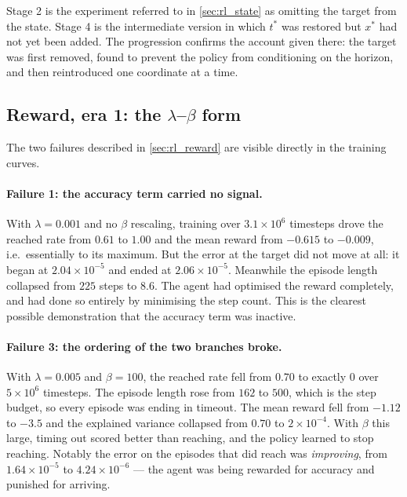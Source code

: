 Stage 2 is the experiment referred to in \cref{sec:rl_state} as omitting the
target from the state. Stage 4 is the intermediate version in which $t^*$ was
restored but $x^*$ had not yet been added. The progression confirms the
account given there: the target was first removed, found to prevent the policy
from conditioning on the horizon, and then reintroduced one coordinate at a
time.

\subsection{Reward, era 1: the \texorpdfstring{$\lambda$--$\beta$}{lambda-beta} form}
\label{sec:rl_record_reward1}

The two failures described in \cref{sec:rl_reward} are visible directly in the
training curves.

\paragraph{Failure 1: the accuracy term carried no signal.}
With $\lambda = 0.001$ and no $\beta$ rescaling, training over
$3.1\times10^6$ timesteps drove the reached rate from $0.61$ to $1.00$ and the
mean reward from $-0.615$ to $-0.009$, i.e.\ essentially to its maximum. But
the error at the target did not move at all: it began at
$2.04\times10^{-5}$ and ended at $2.06\times10^{-5}$. Meanwhile the episode
length collapsed from $225$ steps to $8.6$. The agent had optimised the reward
completely, and had done so entirely by minimising the step count. This is the
clearest possible demonstration that the accuracy term was inactive.

\paragraph{Failure 3: the ordering of the two branches broke.}
With $\lambda = 0.005$ and $\beta = 100$, the reached rate fell from $0.70$ to
exactly $0$ over $5\times10^6$ timesteps. The episode length rose from $162$
to $500$, which is the step budget, so every episode was ending in timeout. The
mean reward fell from $-1.12$ to $-3.5$ and the explained variance collapsed
from $0.70$ to $2\times10^{-4}$. With $\beta$ this large, timing out scored
better than reaching, and the policy learned to stop reaching. Notably the
error on the episodes that did reach was \emph{improving}, from
$1.64\times10^{-5}$ to $4.24\times10^{-6}$ --- the agent was being rewarded for
accuracy and punished for arriving.

